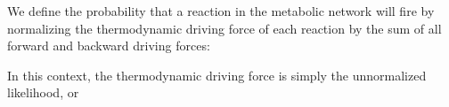 
We define the probability that a reaction in the metabolic network will fire by normalizing the thermodynamic driving force of each reaction by the sum of all forward and backward driving forces:

In this context, the thermodynamic driving force is simply the unnormalized likelihood, or 
